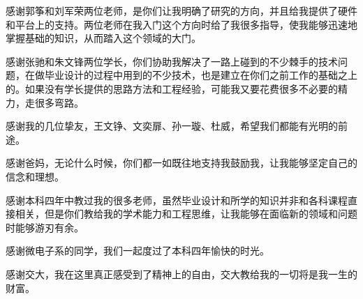 \begin{thanks}

感谢郭筝和刘军荣两位老师，是你们让我明确了研究的方向，并且给我提供了硬件和平台上的支持。两位老师在我入门这个方向时给了我很多指导，使我能够迅速地掌握基础的知识，从而踏入这个领域的大门。

感谢张驰和朱文锋两位学长，你们协助我解决了一路上碰到的不少棘手的技术问题，在做毕业设计的过程中用到的不少技术，也是建立在你们之前工作的基础之上的。如果没有学长提供的思路方法和工程经验，可能我又要花费很多不必要的精力，走很多弯路。

感谢我的几位挚友，王文铮、文奕扉、孙一璇、杜威，希望我们都能有光明的前途。

感谢爸妈，无论什么时候，你们都一如既往地支持我鼓励我，让我能够坚定自己的信念和理想。

感谢本科四年中教过我的很多老师，虽然毕业设计和所学的知识并非和各科课程直接相关，但是你们教给我的学术能力和工程思维，让我能够在面临新的领域和问题时能够游刃有余。

感谢微电子系的同学，我们一起度过了本科四年愉快的时光。

感谢交大，我在这里真正感受到了精神上的自由，交大教给我的一切将是我一生的财富。


\end{thanks}
